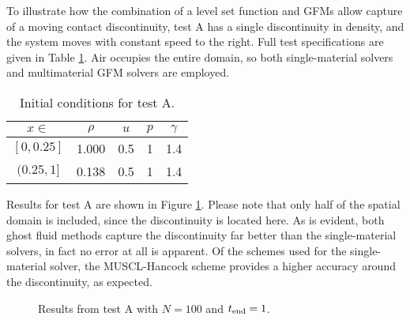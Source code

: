 \documentclass[final,3p,twocolumn]{elsarticle}
\begin{document}
To illustrate how the combination of a level set function and GFMs allow
capture of a moving contact discontinuity, test A has a single discontinuity in
density, and the system moves with constant speed to the right. Full test
specifications are given in Table \ref{tab:testA}. Air occupies the entire
domain, so both single-material solvers and multimaterial GFM solvers are
employed. 

\begin{table}[htb]
    \label{tab:testA}
    \centering
    \begin{tabular}{ccccc}
        \hline
        $x \in $ & $\rho$ & $u$ & $p$ & $\gamma$ \\
        \hline
        $[0,0.25]$ & 1.000 & 0.5 & 1 & 1.4 \\
        $(0.25,1]$ & 0.138 & 0.5 & 1 & 1.4 \\
        \hline
    \end{tabular}
    \caption{Initial conditions for test A.}
\end{table}

Results for test A are shown in Figure \ref{fig:testA}. Please note that only
half of the spatial domain is included, since the discontinuity is located
here. As is evident, both ghost fluid methods capture the discontinuity far
better than the single-material solvers, in fact no error at all is apparent.
Of the schemes used for the single-material solver, the MUSCL-Hancock scheme
provides a higher accuracy around the discontinuity, as expected. 


\begin{figure}[htb]
    \centering
    \caption[caption]
    {
        Results from test A with $N=100$ and $t_{\rm end}=1$. 
    }
    \label{fig:testA}
\end{figure}
\end{document}
